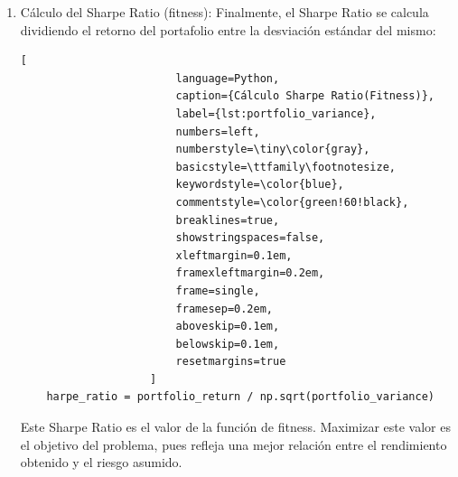 \documentclass[9pt,a4paper,twoside]{rho-class/rho}
\begin{document}
\begin{enumerate}
                    \begin{lstlisting}[
                        language=Python,
                        caption={Cálculo de la varianza del portafolio},
                        label={lst:portfolio_variance},
                        numbers=left,
                        numberstyle=\tiny\color{gray},
                        basicstyle=\ttfamily\footnotesize,
                        keywordstyle=\color{blue},
                        commentstyle=\color{green!60!black},
                        breaklines=true,
                        showstringspaces=false,
                        xleftmargin=0.1em,
                        framexleftmargin=0.2em,
                        frame=single,
                        framesep=0.2em,
                        aboveskip=0.1em,
                        belowskip=0.1em,
                        resetmargins=true
                    ]
    portfolio_variance = np.dot(weights, np.dot(cov_matrix, weights))
                    \end{lstlisting}
                    La varianza es una medida del riesgo total del portafolio. La raíz cuadrada de esta varianza nos da la desviación estándar del portafolio, que representa el riesgo asumido al invertir en esta combinación de activos.
                
                \item Cálculo del Sharpe Ratio (fitness): Finalmente, el Sharpe Ratio se calcula dividiendo el retorno del portafolio entre la desviación estándar del mismo:        
                    \begin{lstlisting}[
                        language=Python,
                        caption={Cálculo Sharpe Ratio(Fitness)},
                        label={lst:portfolio_variance},
                        numbers=left,
                        numberstyle=\tiny\color{gray},
                        basicstyle=\ttfamily\footnotesize,
                        keywordstyle=\color{blue},
                        commentstyle=\color{green!60!black},
                        breaklines=true,
                        showstringspaces=false,
                        xleftmargin=0.1em,
                        framexleftmargin=0.2em,
                        frame=single,
                        framesep=0.2em,
                        aboveskip=0.1em,
                        belowskip=0.1em,
                        resetmargins=true
                    ]
    harpe_ratio = portfolio_return / np.sqrt(portfolio_variance)
                    \end{lstlisting}
                    Este Sharpe Ratio es el valor de la función de fitness. Maximizar este valor es el objetivo del problema, pues refleja una mejor relación entre el rendimiento obtenido y el riesgo asumido.
            \end{enumerate}
\end{document}
